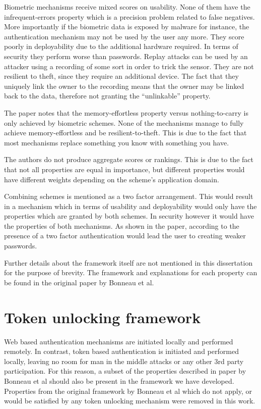 Biometric mechanisms receive mixed scores on usability. None of them have the infrequent-errors property which is a precision problem related to false negatives. More importantly if the biometric data is exposed by malware for instance, the authentication mechanism may not be used by the user any more. They score poorly in deployability due to the additional hardware required. In terms of security they perform worse than passwords. Replay attacks can be used by an attacker using a recording of some sort in order to trick the sensor. They are not resilient to theft, since they require an additional device. The fact that they uniquely link the owner to the recording means that the owner may be linked back to the data, therefore not granting the ``unlinkable'' property. 

The paper notes that the memory-effortless property versus nothing-to-carry is only achieved by biometric schemes. None of the mechanisms manage to fully achieve memory-effortless and be resilient-to-theft. This is due to the fact that most mechanisms replace something you know with something you have.

The authors do not produce aggregate scores or rankings. This is due to the fact that not all properties are equal in importance, but different properties would have different weights depending on the scheme's application domain. 

Combining schemes is mentioned as a two factor arrangement. This would result in a mechanism which in terms of usability and deployability would only have the properties which are granted by both schemes. In security however it would have the properties of both mechanisms. As shown in the paper, according to \cite{wimberly2011using} the presence of a two factor authentication would lead the user to creating weaker passwords.

Further details about the framework itself are not mentioned in this dissertation for the purpose of brevity. The framework and explanations for each property can be found in the original paper \cite{bonneau2012quest} by Bonneau et al.

\section{Token unlocking framework}
Web based authentication mechanisms are initiated locally and performed remotely. In contrast, token based authentication is initiated and performed locally, leaving no room for man in the middle attacks or any other 3rd party participation. For this reason, a subset of the properties described in paper \cite{bonneau2012quest} by Bonneau et al should also be present in the framework we have developed. Properties from the original framework by Bonneau et al which do not apply, or would be satisfied by any token unlocking mechanism were removed in this work.


